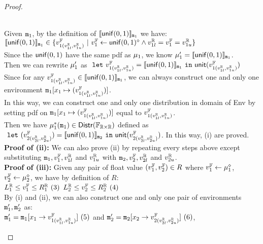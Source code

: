 \documentclass[a4paper,11pt]{article}
\begin{document}
\begin{proof}
\begin{itemize}
\begin{subproof}
	\\
	Given $\mathtt{m}_1$, by the definition of $\llbracket \mathsf{unif}(0, 1) \rrbracket_{\mathtt{m}_1}$ we have:
	\\
	$ \llbracket \mathsf{unif}(0, 1) \rrbracket_{\mathtt{m}_1} \in  
	\{v^{\mathbb{F}}_{1(v^{\mathbb{R}}_{1l}, v^{\mathbb{R}}_{1u})} 
	~|~ v^{\mathbb{F}}_1 \leftarrow \mathsf{unif}(0, 1)^{\diamond} 
	\land v^{\mathbb{R}}_{1l} = v^{\mathbb{F}}_1 = v^{\mathbb{R}}_{1u}\}$
	\\
	Since the $\mathsf{unif}(0, 1)$ have the same pdf as $\mu_1$, we know $\mu'_1 = \llbracket \mathsf{unif}(0, 1) \rrbracket_{\mathtt{m}_1}$.
	\\
	Then we can rewrite $\mu'_1$ as 
	$~\mathtt{let}~ v^{\mathbb{F}}_{1(v^{\mathbb{R}}_{1l}, v^{\mathbb{R}}_{1u})} = \llbracket \mathsf{unif}(0, 1) \rrbracket_{\mathtt{m}_1} 
	~\mathtt{in}~ \mathsf{unit}(v^{\mathbb{F}}_{1(v^{\mathbb{R}}_{1l}, v^{\mathbb{R}}_{1u})})$
	\\
	Since for any $v^{\mathbb{F}}_{1(v^{\mathbb{R}}_{1l}, v^{\mathbb{R}}_{1u})} \in \llbracket \mathsf{unif}(0, 1) \rrbracket_{\mathtt{m}_1}$, 
	we can always construct one and only one environment $\mathtt{m}_1[x_1 \mapsto (v^{\mathbb{F}}_{1(v^{\mathbb{R}}_{1l}, v^{\mathbb{R}}_{1u})})]$.
	\\
	In this way, we can construct one and only one distribution in domain of Env 
	by setting pdf on 
	$\mathtt{m}_1[x_1 \mapsto (v^{\mathbb{F}}_{1(v^{\mathbb{R}}_{1l}, v^{\mathbb{R}}_{1u})})]$
	equal to 
	$v^{\mathbb{F}}_{1(v^{\mathbb{R}}_{1l}, v^{\mathbb{R}}_{1u})}$.
	\\
	Then we have $\mu^*_1(\mathtt{m}_1) \in \mathsf{Distr}(\mathbb{F}_{\mathbb{R} \times \mathbb{R}})$ defined as 
	$~\mathtt{let}~ (v^{\mathbb{F}}_{2(v^{\mathbb{R}}_{2l}, v^{\mathbb{R}}_{2u})}) 
	= \llbracket \mathsf{unif}(0, 1) \rrbracket_{\mathtt{m}_2} 
	~\mathtt{in}~
	\mathsf{unit}(v^{\mathbb{F}}_{2(v^{\mathbb{R}}_{2l}, v^{\mathbb{R}}_{2u})})$.
	In this way, (i) are proved.
	\\
	\textbf{Proof of (ii):} We can also prove (ii) by repeating every steps above except substituting $\mathtt{m}_1, v^{\mathbb{F}}_1, v^{\mathbb{R}}_{1l}$ and $v^{\mathbb{R}}_{1u}$ with $\mathtt{m}_2, v^{\mathbb{F}}_2, v^{\mathbb{R}}_{2l}$ and $v^{\mathbb{R}}_{2u}$.
	\\
	\textbf{Proof of (iii):} Given any pair of float value $(v^{\mathbb{F}}_1, v^{\mathbb{F}}_2) \in R$ where 
	$v^{\mathbb{F}}_1 \leftarrow \mu_1^{\diamond}$, $v^{\mathbb{F}}_2 \leftarrow \mu_2^{\diamond}$, we have by definition of $R$:
	\\
	$L^{\mathbb{R}}_1 \leq v^{\mathbb{F}}_1 \leq R^{\mathbb{R}}_1 ~ (3)$
	$L^{\mathbb{R}}_2 \leq v^{\mathbb{F}}_2 \leq R^{\mathbb{R}}_2 ~ (4)$
	\\
	By (i) and (ii), we can also construct one and only one pair of environments $\mathtt{m}_1', \mathtt{m}_2'$ as:
	\\
	$\mathtt{m}_1' = \mathtt{m}_1[x_1 \to v^{\mathbb{F}}_{1(v^{\mathbb{R}}_{1l}, v^{\mathbb{R}}_{1u})}] ~ (5)$ and
	$\mathtt{m}_2' = \mathtt{m}_2[x_2 \to v^{\mathbb{F}}_{2(v^{\mathbb{R}}_{2l}, v^{\mathbb{R}}_{2u})}] ~ (6)$,
	\\

\end{subproof}
\end{itemize}
\end{proof}
\end{document}

